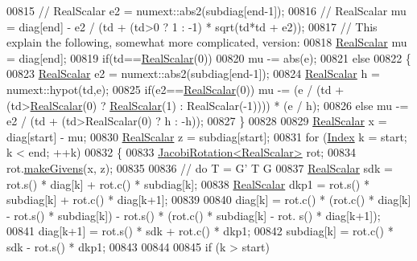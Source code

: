 \begin{DoxyCode}
00815 \textcolor{comment}{//   RealScalar e2 = numext::abs2(subdiag[end-1]);}
00816 \textcolor{comment}{//   RealScalar mu = diag[end] - e2 / (td + (td>0 ? 1 : -1) * sqrt(td*td + e2));}
00817   \textcolor{comment}{// This explain the following, somewhat more complicated, version:}
00818   \hyperlink{group___eigenvalues___module_a5dae5f422a3c71060e6bd31332bf64fd}{RealScalar} mu = diag[end];
00819   \textcolor{keywordflow}{if}(td==\hyperlink{group___eigenvalues___module_a5dae5f422a3c71060e6bd31332bf64fd}{RealScalar}(0))
00820     mu -= abs(e);
00821   \textcolor{keywordflow}{else}
00822   \{
00823     \hyperlink{group___eigenvalues___module_a5dae5f422a3c71060e6bd31332bf64fd}{RealScalar} e2 = numext::abs2(subdiag[end-1]);
00824     \hyperlink{group___eigenvalues___module_a5dae5f422a3c71060e6bd31332bf64fd}{RealScalar} h = numext::hypot(td,e);
00825     \textcolor{keywordflow}{if}(e2==\hyperlink{group___eigenvalues___module_a5dae5f422a3c71060e6bd31332bf64fd}{RealScalar}(0)) mu -= (e / (td + (td>\hyperlink{group___eigenvalues___module_a5dae5f422a3c71060e6bd31332bf64fd}{RealScalar}(0) ? 
      \hyperlink{group___eigenvalues___module_a5dae5f422a3c71060e6bd31332bf64fd}{RealScalar}(1) : RealScalar(-1)))) * (e / h);
00826     \textcolor{keywordflow}{else}                  mu -= e2 / (td + (td>RealScalar(0) ? h : -h));
00827   \}
00828   
00829   \hyperlink{group___eigenvalues___module_a5dae5f422a3c71060e6bd31332bf64fd}{RealScalar} x = diag[start] - mu;
00830   \hyperlink{group___eigenvalues___module_a5dae5f422a3c71060e6bd31332bf64fd}{RealScalar} z = subdiag[start];
00831   \textcolor{keywordflow}{for} (\hyperlink{group___eigenvalues___module_a8a59ab7734b6eae2754fd78bc7c3a360}{Index} k = start; k < end; ++k)
00832   \{
00833     \hyperlink{group___jacobi___module_class_eigen_1_1_jacobi_rotation}{JacobiRotation<RealScalar>} rot;
00834     rot.\hyperlink{group___jacobi___module_af73c81e9cc139b7e0d877ce553b02ec0}{makeGivens}(x, z);
00835 
00836     \textcolor{comment}{// do T = G' T G}
00837     \hyperlink{group___eigenvalues___module_a5dae5f422a3c71060e6bd31332bf64fd}{RealScalar} sdk = rot.s() * diag[k] + rot.c() * subdiag[k];
00838     \hyperlink{group___eigenvalues___module_a5dae5f422a3c71060e6bd31332bf64fd}{RealScalar} dkp1 = rot.s() * subdiag[k] + rot.c() * diag[k+1];
00839 
00840     diag[k] = rot.c() * (rot.c() * diag[k] - rot.s() * subdiag[k]) - rot.s() * (rot.c() * subdiag[k] - rot.
      s() * diag[k+1]);
00841     diag[k+1] = rot.s() * sdk + rot.c() * dkp1;
00842     subdiag[k] = rot.c() * sdk - rot.s() * dkp1;
00843     
00844 
00845     \textcolor{keywordflow}{if} (k > start)

\end{DoxyCode}
